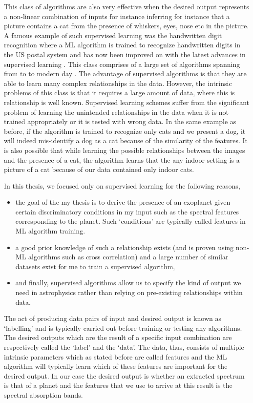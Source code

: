 \begin{enumerate}
    This class of algorithms are also very effective when the desired output represents a non-linear combination of inputs for instance inferring for instance that a picture contains a cat from the presence of whiskers, eyes, nose etc in the picture.
    A famous example of such supervised learning was the handwritten digit recognition where a ML algorithm is trained to recognize handwritten digits in the US postal system and has now been improved on with the latest advances in supervised learning \cite{kussul2004improved}.
    This class comprises of a large set of algorithms spanning from \citep[neural networks,][]{gurney1997introduction} to \citep[random forests,][]{breiman2001random} to modern day \citep[transformers,][]{vaswani2017attention}.
    The advantage of supervised algorithms is that they are able to learn many complex relationships in the data. 
    However, the intrinsic problems of this class is that it requires a large amount of data, where this is relationship is well known.
    Supervised learning schemes suffer from the significant problem of learning the unintended relationships in the data when it is not trained appropriately or it is tested with wrong data.
    In the same example as before, if the algorithm is trained to recognize only cats and we present a dog, it will indeed mis-identify a dog as a cat because of the similarity of the features.
    It is also possible that while learning the possible relationships between the images and the presence of a cat, the algorithm learns that the any indoor setting is a picture of a cat because of our data contained only indoor cats.
    \end{enumerate}
In this thesis, we focused only on supervised learning for the following reasons,
\begin{itemize}
    \item the goal of the my thesis is to derive the presence of an exoplanet given certain discriminatory conditions in my input such as the spectral features corresponding to the planet.
    Such `conditions' are typically called features in ML algorithm training.
    \item a good prior knowledge of such a relationship exists (and is proven using non-ML algorithms such as cross correlation) and a large number of similar datasets exist for me to train a supervised algorithm,
    \item and finally, supervised algorithms allow us to specify the kind of output we need in astrophysics rather than relying on pre-existing relationships within data.
\end{itemize}
The act of producing data pairs of input and desired output is known as `labelling' and is typically carried out before training or testing any algorithms.
The desired outputs which are the result of a specific input combination are respectively called the `label' and the `data'. 
The data, thus, consists of multiple intrinsic parameters which as stated before are called features and the ML algorithm will typically learn which of these features are important for the desired output.
In our case the desired output is whether an extracted spectrum is that of a planet and the features that we use to arrive at this result is the spectral absorption bands.

